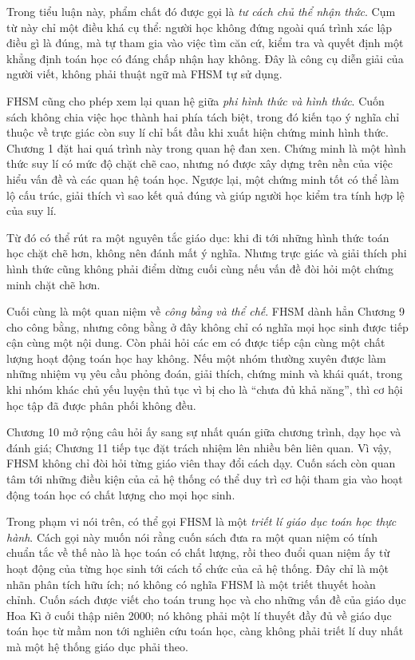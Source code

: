 Trong tiểu luận này, phẩm chất đó được gọi là \emph{tư cách chủ thể nhận thức}. Cụm từ này chỉ một điều khá cụ thể: người học không đứng ngoài quá trình xác lập điều gì là đúng, mà tự tham gia vào việc tìm căn cứ, kiểm tra và quyết định một khẳng định toán học có đáng chấp nhận hay không. Đây là công cụ diễn giải của người viết, không phải thuật ngữ mà FHSM tự sử dụng.

FHSM cũng cho phép xem lại quan hệ giữa \emph{phi hình thức và hình thức}. Cuốn sách không chia việc học thành hai phía tách biệt, trong đó kiến tạo ý nghĩa chỉ thuộc về trực giác còn suy lí chỉ bắt đầu khi xuất hiện chứng minh hình thức. Chương 1 đặt hai quá trình này trong quan hệ đan xen. Chứng minh là một hình thức suy lí có mức độ chặt chẽ cao, nhưng nó được xây dựng trên nền của việc hiểu vấn đề và các quan hệ toán học. Ngược lại, một chứng minh tốt có thể làm lộ cấu trúc, giải thích vì sao kết quả đúng và giúp người học kiểm tra tính hợp lệ của suy lí.

Từ đó có thể rút ra một nguyên tắc giáo dục: khi đi tới những hình thức toán học chặt chẽ hơn, không nên đánh mất ý nghĩa. Nhưng trực giác và giải thích phi hình thức cũng không phải điểm dừng cuối cùng nếu vấn đề đòi hỏi một chứng minh chặt chẽ hơn.

Cuối cùng là một quan niệm về \emph{công bằng và thể chế}. FHSM dành hẳn Chương 9 cho công bằng, nhưng công bằng ở đây không chỉ có nghĩa mọi học sinh được tiếp cận cùng một nội dung. Còn phải hỏi các em có được tiếp cận cùng một chất lượng hoạt động toán học hay không. Nếu một nhóm thường xuyên được làm những nhiệm vụ yêu cầu phỏng đoán, giải thích, chứng minh và khái quát, trong khi nhóm khác chủ yếu luyện thủ tục vì bị cho là ``chưa đủ khả năng'', thì cơ hội học tập đã được phân phối không đều.

Chương 10 mở rộng câu hỏi ấy sang sự nhất quán giữa chương trình, dạy học và đánh giá; Chương 11 tiếp tục đặt trách nhiệm lên nhiều bên liên quan. Vì vậy, FHSM không chỉ đòi hỏi từng giáo viên thay đổi cách dạy. Cuốn sách còn quan tâm tới những điều kiện của cả hệ thống có thể duy trì cơ hội tham gia vào hoạt động toán học có chất lượng cho mọi học sinh.

Trong phạm vi nói trên, có thể gọi FHSM là một \emph{triết lí giáo dục toán học thực hành}. Cách gọi này muốn nói rằng cuốn sách đưa ra một quan niệm có tính chuẩn tắc về thế nào là học toán có chất lượng, rồi theo đuổi quan niệm ấy từ hoạt động của từng học sinh tới cách tổ chức của cả hệ thống. Đây chỉ là một nhãn phân tích hữu ích; nó không có nghĩa FHSM là một triết thuyết hoàn chỉnh. Cuốn sách được viết cho toán trung học và cho những vấn đề của giáo dục Hoa Kì ở cuối thập niên 2000; nó không phải một lí thuyết đầy đủ về giáo dục toán học từ mầm non tới nghiên cứu toán học, càng không phải triết lí duy nhất mà một hệ thống giáo dục phải theo.

